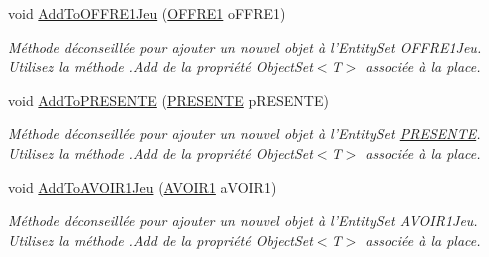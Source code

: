 \begin{DoxyCompactItemize}
void \hyperlink{class_model_1_1_b_d_d___s_i_o7_entities_aca1c2afc639447dc937518b9f5f7046a}{Add\-To\-O\-F\-F\-R\-E1\-Jeu} (\hyperlink{class_model_1_1_o_f_f_r_e1}{O\-F\-F\-R\-E1} o\-F\-F\-R\-E1)
\begin{DoxyCompactList}\small\item\em Méthode déconseillée pour ajouter un nouvel objet à l'Entity\-Set O\-F\-F\-R\-E1\-Jeu. Utilisez la méthode .Add de la propriété Object\-Set$<$T$>$ associée à la place. \end{DoxyCompactList}\item 
void \hyperlink{class_model_1_1_b_d_d___s_i_o7_entities_a77379f47a61f5e58dd59851d30ad6f4f}{Add\-To\-P\-R\-E\-S\-E\-N\-T\-E} (\hyperlink{class_model_1_1_p_r_e_s_e_n_t_e}{P\-R\-E\-S\-E\-N\-T\-E} p\-R\-E\-S\-E\-N\-T\-E)
\begin{DoxyCompactList}\small\item\em Méthode déconseillée pour ajouter un nouvel objet à l'Entity\-Set \hyperlink{class_model_1_1_p_r_e_s_e_n_t_e}{P\-R\-E\-S\-E\-N\-T\-E}. Utilisez la méthode .Add de la propriété Object\-Set$<$T$>$ associée à la place. \end{DoxyCompactList}\item 
void \hyperlink{class_model_1_1_b_d_d___s_i_o7_entities_a9510bff763ce90ed7ab7aaeca09b31cc}{Add\-To\-A\-V\-O\-I\-R1\-Jeu} (\hyperlink{class_model_1_1_a_v_o_i_r1}{A\-V\-O\-I\-R1} a\-V\-O\-I\-R1)
\begin{DoxyCompactList}\small\item\em Méthode déconseillée pour ajouter un nouvel objet à l'Entity\-Set A\-V\-O\-I\-R1\-Jeu. Utilisez la méthode .Add de la propriété Object\-Set$<$T$>$ associée à la place. \end{DoxyCompactList}\end{DoxyCompactItemize}
